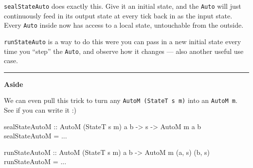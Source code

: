 \documentclass[]{article}
\newenvironment{Shaded}{}{}
\newcommand{\CommentTok}[1]{\textcolor[rgb]{0.38,0.63,0.69}{\textit{#1}}}
\newcommand{\DataTypeTok}[1]{\textcolor[rgb]{0.56,0.13,0.00}{#1}}
\newcommand{\KeywordTok}[1]{\textcolor[rgb]{0.00,0.44,0.13}{\textbf{#1}}}
\newcommand{\NormalTok}[1]{#1}
\newcommand{\OperatorTok}[1]{\textcolor[rgb]{0.40,0.40,0.40}{#1}}
\newcommand{\OtherTok}[1]{\textcolor[rgb]{0.00,0.44,0.13}{#1}}
\begin{document}
\begin{Shaded}
\end{Shaded}

\texttt{sealStateAuto} does exactly this. Give it an initial state, and the
\texttt{Auto} will just continuously feed in its output state at every tick back
in as the input state. Every \texttt{Auto} inside now has access to a local
state, untouchable from the outside.

\texttt{runStateAuto} is a way to do this were you can pass in a new initial
state every time you ``step'' the \texttt{Auto}, and observe how it changes ---
also another useful use case.

\begin{center}\rule{0.5\linewidth}{\linethickness}\end{center}

\textbf{Aside}

We can even pull this trick to turn any \texttt{AutoM\ (StateT\ s\ m)} into an
\texttt{AutoM\ m}. See if you can write it :)

\begin{Shaded}
\begin{Highlighting}[]
\OtherTok{sealStateAutoM ::} \DataTypeTok{AutoM}\NormalTok{ (}\DataTypeTok{StateT}\NormalTok{ s m) a b }\OtherTok{{-}>}\NormalTok{ s }\OtherTok{{-}>} \DataTypeTok{AutoM}\NormalTok{ m a b}
\NormalTok{sealStateAutoM }\OtherTok{=} \OperatorTok{...}

\OtherTok{runStateAutoM ::} \DataTypeTok{AutoM}\NormalTok{ (}\DataTypeTok{StateT}\NormalTok{ s m) a b }\OtherTok{{-}>} \DataTypeTok{AutoM}\NormalTok{ m (a, s) (b, s)}
\NormalTok{runStateAutoM }\OtherTok{=} \OperatorTok{...}
\end{Highlighting}
\end{Shaded}
\end{document}
